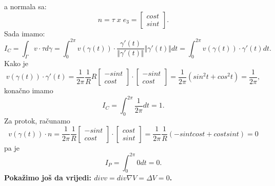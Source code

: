 \documentclass[a4paper,oneside,12pt]{memoir} %
\begin{document}
a normala sa:
\begin{equation*}
n = \tau \; x \; e_3 = \begin{bmatrix}
   					 cost \\
 					 sint
  				 \end{bmatrix}.
\end{equation*}
Sada imamo:
\begin{equation*}
I_C = \int_\Gamma v \cdot \tau d\gamma = \int_0^{2\pi} v(\gamma(t)) \cdot \frac{\gamma'(t)}{\Vert \gamma'(t) \Vert} \Vert \gamma'(t) \Vert dt = \int_0^{2\pi} v(\gamma(t)) \cdot \gamma'(t)  dt.
\end{equation*}
Kako je
\begin{equation*}
v(\gamma(t)) \cdot \gamma'(t) = \frac{1}{2\pi}\frac{1}{R} R \begin{bmatrix}
   												     		   -sint \\
 											        		    cost
  											   			   \end{bmatrix} 
  											   \cdot 	   \begin{bmatrix}
   												     		   -sint \\
 											        		    cost
  											   			   \end{bmatrix}
  							  = \frac{1}{2\pi} (sin^2t + cos^2t) = \frac{1}{2\pi},
\end{equation*}
konačno imamo
\begin{equation*}
I_C = \int_0^{2\pi} \frac{1}{2\pi} dt = 1.
\end{equation*}
Za protok, računamo
\begin{equation*}
v(\gamma(t)) \cdot n = \frac{1}{2\pi}\frac{1}{R} \begin{bmatrix}
   												     -sint \\
 											          cost
  											   	 \end{bmatrix} 
  											   \cdot 	   \begin{bmatrix}
   												     		    cost \\
 											        		    sint
  											   			   \end{bmatrix}
  					 = \frac{1}{2\pi}\frac{1}{R} (-sintcost + costsint) = 0
\end{equation*}
pa je
\begin{equation*}
I_P = \int_0^{2\pi} 0 dt = 0.
\end{equation*}
$ $\\
$ $\\
\textbf{Pokažimo još da vrijedi: $div v = div \nabla V = \Delta V = 0$.} \\
\end{document}
